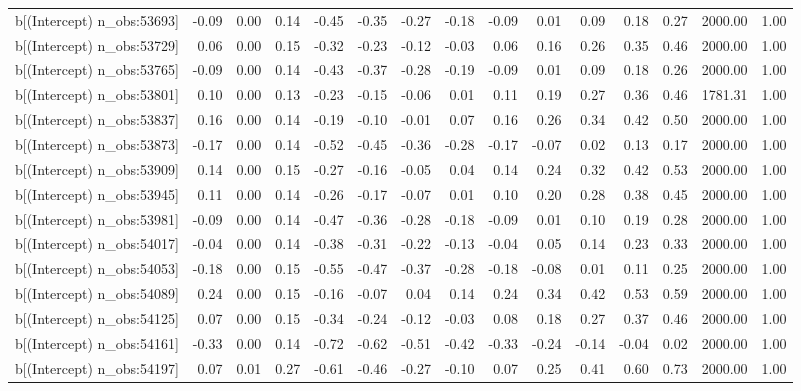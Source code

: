 \begin{table}[ht]
\begin{tabular}{rrrrrrrrrrrrrrr}
  b[(Intercept) n\_obs:53693] & -0.09 & 0.00 & 0.14 & -0.45 & -0.35 & -0.27 & -0.18 & -0.09 & 0.01 & 0.09 & 0.18 & 0.27 & 2000.00 & 1.00 \\ 
  b[(Intercept) n\_obs:53729] & 0.06 & 0.00 & 0.15 & -0.32 & -0.23 & -0.12 & -0.03 & 0.06 & 0.16 & 0.26 & 0.35 & 0.46 & 2000.00 & 1.00 \\ 
  b[(Intercept) n\_obs:53765] & -0.09 & 0.00 & 0.14 & -0.43 & -0.37 & -0.28 & -0.19 & -0.09 & 0.01 & 0.09 & 0.18 & 0.26 & 2000.00 & 1.00 \\ 
  b[(Intercept) n\_obs:53801] & 0.10 & 0.00 & 0.13 & -0.23 & -0.15 & -0.06 & 0.01 & 0.11 & 0.19 & 0.27 & 0.36 & 0.46 & 1781.31 & 1.00 \\ 
  b[(Intercept) n\_obs:53837] & 0.16 & 0.00 & 0.14 & -0.19 & -0.10 & -0.01 & 0.07 & 0.16 & 0.26 & 0.34 & 0.42 & 0.50 & 2000.00 & 1.00 \\ 
  b[(Intercept) n\_obs:53873] & -0.17 & 0.00 & 0.14 & -0.52 & -0.45 & -0.36 & -0.28 & -0.17 & -0.07 & 0.02 & 0.13 & 0.17 & 2000.00 & 1.00 \\ 
  b[(Intercept) n\_obs:53909] & 0.14 & 0.00 & 0.15 & -0.27 & -0.16 & -0.05 & 0.04 & 0.14 & 0.24 & 0.32 & 0.42 & 0.53 & 2000.00 & 1.00 \\ 
  b[(Intercept) n\_obs:53945] & 0.11 & 0.00 & 0.14 & -0.26 & -0.17 & -0.07 & 0.01 & 0.10 & 0.20 & 0.28 & 0.38 & 0.45 & 2000.00 & 1.00 \\ 
  b[(Intercept) n\_obs:53981] & -0.09 & 0.00 & 0.14 & -0.47 & -0.36 & -0.28 & -0.18 & -0.09 & 0.01 & 0.10 & 0.19 & 0.28 & 2000.00 & 1.00 \\ 
  b[(Intercept) n\_obs:54017] & -0.04 & 0.00 & 0.14 & -0.38 & -0.31 & -0.22 & -0.13 & -0.04 & 0.05 & 0.14 & 0.23 & 0.33 & 2000.00 & 1.00 \\ 
  b[(Intercept) n\_obs:54053] & -0.18 & 0.00 & 0.15 & -0.55 & -0.47 & -0.37 & -0.28 & -0.18 & -0.08 & 0.01 & 0.11 & 0.25 & 2000.00 & 1.00 \\ 
  b[(Intercept) n\_obs:54089] & 0.24 & 0.00 & 0.15 & -0.16 & -0.07 & 0.04 & 0.14 & 0.24 & 0.34 & 0.42 & 0.53 & 0.59 & 2000.00 & 1.00 \\ 
  b[(Intercept) n\_obs:54125] & 0.07 & 0.00 & 0.15 & -0.34 & -0.24 & -0.12 & -0.03 & 0.08 & 0.18 & 0.27 & 0.37 & 0.46 & 2000.00 & 1.00 \\ 
  b[(Intercept) n\_obs:54161] & -0.33 & 0.00 & 0.14 & -0.72 & -0.62 & -0.51 & -0.42 & -0.33 & -0.24 & -0.14 & -0.04 & 0.02 & 2000.00 & 1.00 \\ 
  b[(Intercept) n\_obs:54197] & 0.07 & 0.01 & 0.27 & -0.61 & -0.46 & -0.27 & -0.10 & 0.07 & 0.25 & 0.41 & 0.60 & 0.73 & 2000.00 & 1.00 \\ 

\end{tabular}
\end{table}

